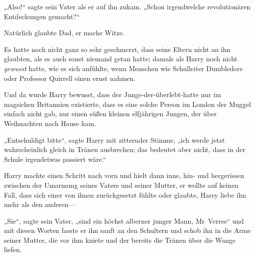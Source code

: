 „Also!“ sagte sein Vater als er auf ihn zukam. „Schon irgendwelche revolutionären Entdeckungen gemacht?“

Natürlich glaubte Dad, er mache Witze.

Es hatte noch nicht ganz so sehr geschmerzt, dass seine Eltern nicht an ihn glaubten, als es auch sonst niemand getan hatte; damals als Harry noch nicht \emph{gewusst} hatte, wie es sich anfühlte, wenn Menschen wie Schulleiter Dumbledore oder Professor Quirrell einen ernst nahmen.

Und da wurde Harry bewusst, dass der Junge-der-überlebt-hatte nur im magsichen Britannien existierte, dass es eine solche Person im London der Muggel einfach nicht gab, nur einen süßen kleinen elfjährigen Jungen, der über Weihnachten nach Hause kam.

„Entschuldigt bitte“, sagte Harry mit zitternder Stimme, „ich werde jetzt wahrscheinlich gleich in Tränen ausbrechen; das bedeutet aber nicht, dass in der Schule irgendetwas passiert wäre.“

Harry machte einen Schritt nach vorn und hielt dann inne, hin- und hergerissen zwischen der Umarmung seines Vaters und seiner Mutter, er wollte auf keinen Fall, dass sich einer von ihnen zurückgesetzt fühlte oder glaubte, Harry liebe ihn mehr als den anderen—

„Sie“, sagte sein Vater, „sind ein höchst alberner junger Mann, Mr~Verres“ und mit diesen Worten fasste er ihn sanft an den Schultern und schob ihn in die Arme seiner Mutter, die vor ihm kniete und der bereits die Tränen über die Wange liefen.

